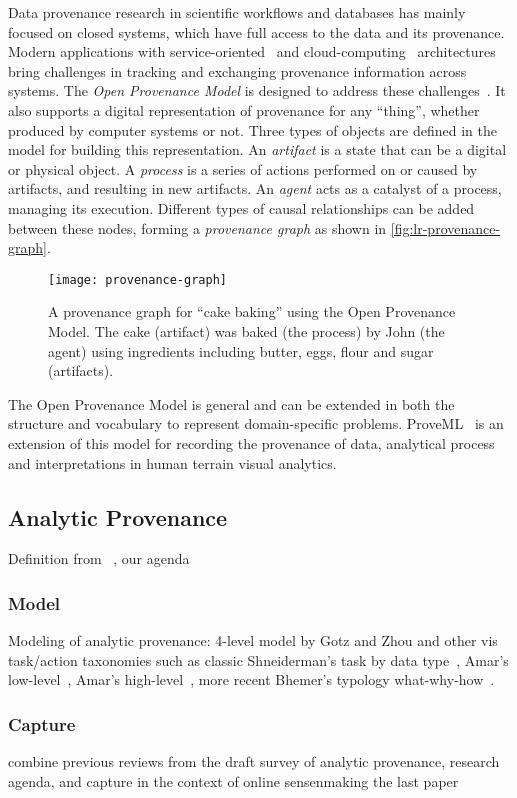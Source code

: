 Data provenance research in scientific workflows and databases has mainly focused on closed systems, which have full access to the data and its provenance. Modern applications with service-oriented~\cite{Papazoglou2007} and cloud-computing~\cite{Buyya2009} architectures bring challenges in tracking and exchanging provenance information across systems. The \emph{Open Provenance Model} is designed to address these challenges~\cite{Moreau2011}. It also supports a digital representation of provenance for any ``thing'', whether produced by computer systems or not. Three types of objects are defined in the model for building this representation. An \emph{artifact} is a state that can be a digital or physical object. A \emph{process} is a series of actions performed on or caused by artifacts, and resulting in new artifacts. An \emph{agent} acts as a catalyst of a process, managing its execution. Different types of causal relationships can be added between these nodes, forming a \emph{provenance graph} as shown in \autoref{fig:lr-provenance-graph}.

\begin{figure}[!htb]
	\centering
	\texttt{[image: provenance-graph]}
	\caption{A provenance graph for ``cake baking'' using the Open Provenance Model. The cake (artifact) was baked (the process) by John (the agent) using ingredients including butter, eggs, flour and sugar (artifacts). }
	\label{fig:lr-provenance-graph}
\end{figure}

The Open Provenance Model is general and can be extended in both the structure and vocabulary to represent domain-specific problems. ProveML~\cite{Walker2013} is an extension of this model for recording the provenance of data, analytical process and interpretations in human terrain visual analytics.

\subsection{Analytic Provenance}
Definition from ~\cite{North2011}, our agenda~\cite{Xu2015}

\subsubsection{Model}
Modeling of analytic provenance: 4-level model by Gotz and Zhou and other vis task/action taxonomies such as classic Shneiderman's task by data type~\cite{Shneiderman1996}, Amar's low-level~\cite{Amar2005}, Amar's high-level~\cite{Amar2004}, more recent Bhemer's typology what-why-how~\cite{Brehmer2013}.

\subsubsection{Capture}
combine previous reviews from the draft survey of analytic provenance, research agenda, and capture in the context of online sensenmaking the last paper